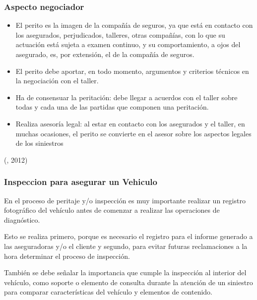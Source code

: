 \subsubsection{Aspecto negociador}
\begin{itemize}

\item El perito es la imagen de la compañía de seguros, ya que está en contacto con los asegurados, perjudicados, talleres, otras compañías, con lo que su actuación está sujeta a examen continuo, y su comportamiento, a ojos del asegurado, es, por extensión, el de la compañía de seguros. 

\item El perito debe aportar, en todo momento, argumentos y criterios técnicos en la negociación con el taller.

\item Ha de consensuar la peritación: debe llegar a acuerdos con el taller sobre todas y cada una de las partidas que componen una peritación.

\item Realiza asesoría legal: al estar en contacto con los asegurados y el taller, en muchas ocasiones, el perito se convierte en el asesor sobre los aspectos legales de los siniestros

\end{itemize}


(\citet{peritobib}, 2012)
\subsubsection{Inspeccion para asegurar un Vehiculo}

En el proceso de peritaje y/o inspección es muy importante realizar un registro fotográfico del vehículo antes de comenzar a realizar las operaciones de diagnóstico.

Esto se realiza primero, porque es necesario el registro para el informe generado a las aseguradoras y/o el cliente y segundo, para evitar futuras reclamaciones a la hora determinar el proceso de inspección.

También se debe señalar la importancia que cumple la inspección al interior del vehículo, como soporte o elemento de consulta durante la atención de un siniestro para comparar características del vehículo y elementos de contenido.

